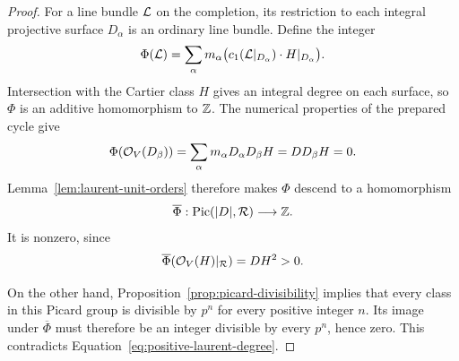 \begin{proof}
For a line bundle \(\mathcal L\) on the completion, its restriction
to each integral projective surface \(D_\alpha\) is an
ordinary line bundle.  Define the integer
\begin{equation}
 \Phi(\mathcal L)=
 \sum_\alpha m_\alpha
   \bigl(c_1(\mathcal L|_{D_\alpha})\cdot H|_{D_\alpha}\bigr).
 \label{eq:formal-integral-degree}
\end{equation}
Intersection with the Cartier class \(H\) gives an integral
degree on each surface, so \(\Phi\) is an additive homomorphism
to \(\mathbb Z\).  The numerical properties of the prepared cycle give
\[
 \Phi(\mathcal O_V(D_\beta))
    =\sum_\alpha m_\alpha D_\alpha D_\beta H
    =DD_\beta H=0.
\]
Lemma~\ref{lem:laurent-unit-orders} therefore makes \(\Phi\)
descend to a homomorphism
\[
                 \overline\Phi:\operatorname{Pic}(|D|,\mathcal R)\longrightarrow\mathbb Z.
\]
It is nonzero, since
\begin{equation}
            \overline\Phi(\mathcal O_V(H)|_{\mathcal R})=DH^2>0.
 \label{eq:positive-laurent-degree}
\end{equation}

On the other hand, Proposition~\ref{prop:picard-divisibility}
implies that every class in this Picard group is divisible by
\(p^n\) for every positive integer \(n\).  Its image under
\(\overline\Phi\) must therefore be an integer divisible by
every \(p^n\), hence zero.  This contradicts
Equation~\eqref{eq:positive-laurent-degree}.
\end{proof}

